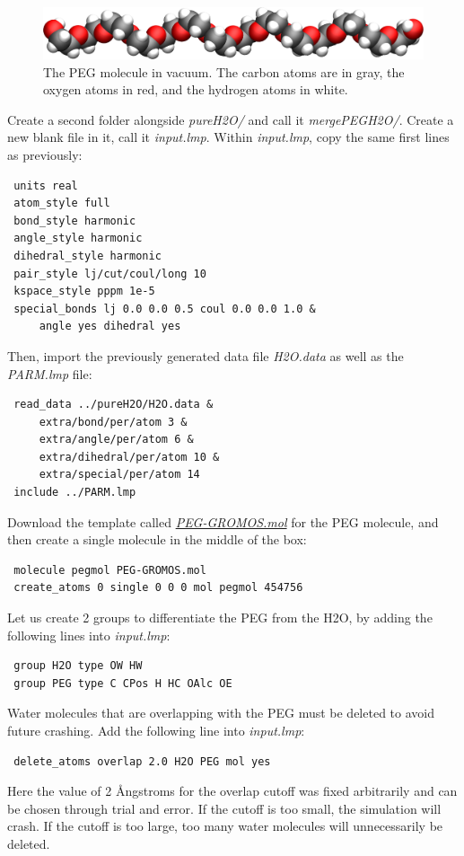 \documentclass[9pt,tutorial]{livecoms}
\newcommand{\filepath}{https://raw.githubusercontent.com/lammpstutorials/lammpstutorials-article/main/files/}
\begin{document}
\begin{figure}
\centering
\includegraphics[width=\linewidth]{PEG-in-vacuum}
\caption{The PEG molecule in vacuum. The carbon atoms are in gray, the oxygen
atoms in red, and the hydrogen atoms in white.}
\label{fig:PEG-in-vacuum}
\end{figure}

Create a second folder alongside \textit{pureH2O/} and call it \textit{mergePEGH2O/}.
Create a new blank file in it, call it \textit{input.lmp}. Within \textit{input.lmp},
copy the same first lines as previously:
{\normalsize \begin{verbatim}
 units real
 atom_style full
 bond_style harmonic
 angle_style harmonic
 dihedral_style harmonic
 pair_style lj/cut/coul/long 10
 kspace_style pppm 1e-5
 special_bonds lj 0.0 0.0 0.5 coul 0.0 0.0 1.0 &
     angle yes dihedral yes
\end{verbatim}}
Then, import the previously generated data file \textit{H2O.data} as well as the \textit{PARM.lmp} file:
{\normalsize \begin{verbatim}
 read_data ../pureH2O/H2O.data &
     extra/bond/per/atom 3 &
     extra/angle/per/atom 6 &
     extra/dihedral/per/atom 10 &
     extra/special/per/atom 14
 include ../PARM.lmp
\end{verbatim}}
Download the template called
\href{\filepath tutorial3/mergePEGH2O/PEG-GROMOS.mol}{\textit{PEG-GROMOS.mol}}
for the PEG molecule, and then create a single molecule in the middle of the box:
{\normalsize \begin{verbatim}
 molecule pegmol PEG-GROMOS.mol
 create_atoms 0 single 0 0 0 mol pegmol 454756
\end{verbatim}}
Let us create 2 groups to differentiate the PEG from the H2O, by adding the following
lines into \textit{input.lmp}:
{\normalsize \begin{verbatim}
 group H2O type OW HW
 group PEG type C CPos H HC OAlc OE
\end{verbatim}}
Water molecules that are overlapping with the PEG must be deleted to avoid future crashing.
Add the following line into \textit{input.lmp}:
{\normalsize \begin{verbatim}
 delete_atoms overlap 2.0 H2O PEG mol yes
\end{verbatim}}
Here the value of 2 Ångstroms for the overlap cutoff was fixed arbitrarily and can
be chosen through trial and error. If the cutoff is too small, the simulation will
crash. If the cutoff is too large, too many water molecules will unnecessarily be
deleted.
\end{document}

